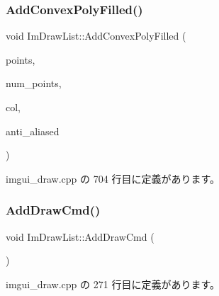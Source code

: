 \subsubsection{\texorpdfstring{Add\+Convex\+Poly\+Filled()}{AddConvexPolyFilled()}}
{\footnotesize\ttfamily void Im\+Draw\+List\+::\+Add\+Convex\+Poly\+Filled (\begin{DoxyParamCaption}\item[{const \mbox{\hyperlink{struct_im_vec2}{Im\+Vec2}} $\ast$}]{points,  }\item[{const int}]{num\+\_\+points,  }\item[{\mbox{\hyperlink{imgui_8h_a118cff4eeb8d00e7d07ce3d6460eed36}{Im\+U32}}}]{col,  }\item[{bool}]{anti\+\_\+aliased }\end{DoxyParamCaption})}



 imgui\+\_\+draw.\+cpp の 704 行目に定義があります。

\mbox{\label{struct_im_draw_list_a846714bb0321c6f1f908767abc8559e6}} 
\subsubsection{\texorpdfstring{Add\+Draw\+Cmd()}{AddDrawCmd()}}
{\footnotesize\ttfamily void Im\+Draw\+List\+::\+Add\+Draw\+Cmd (\begin{DoxyParamCaption}{ }\end{DoxyParamCaption})}



 imgui\+\_\+draw.\+cpp の 271 行目に定義があります。

\mbox{\label{struct_im_draw_list_ac37cd998bf5f40705c7445004a029b66}} 
